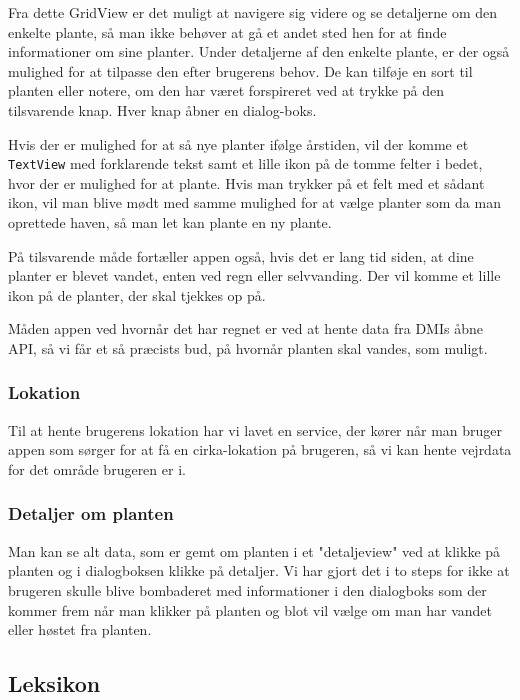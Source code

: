 Fra dette GridView er det muligt at navigere sig videre og se detaljerne om den enkelte plante, så man ikke behøver at gå et andet sted hen for at finde informationer om sine planter. Under detaljerne af den enkelte plante, er der også mulighed for at tilpasse den efter brugerens behov. De kan tilføje en sort til planten eller notere, om den har været forspireret ved at trykke på den tilsvarende knap. Hver knap åbner en dialog-boks.

Hvis der er mulighed for at så nye planter ifølge årstiden, vil der komme et \texttt{TextView} med forklarende tekst samt et lille ikon på de tomme felter i bedet, hvor der er mulighed for at plante. Hvis man trykker på et felt med et sådant ikon, vil man blive mødt med samme mulighed for at vælge planter som da man oprettede haven, så man let kan plante en ny plante.

På tilsvarende måde fortæller appen også, hvis det er lang tid siden, at dine planter er blevet vandet, enten ved regn eller selvvanding. Der vil komme et lille ikon på de planter, der skal tjekkes op på.

Måden appen ved hvornår det har regnet er ved at hente data fra DMIs åbne API, så vi får et så præcists bud, på hvornår planten skal vandes, som muligt.

\subsubsection{Lokation}

Til at hente brugerens lokation har vi lavet en service, der kører når man bruger appen som sørger for at få en cirka-lokation på brugeren, så vi kan hente vejrdata for det område brugeren er i.

\subsubsection{Detaljer om planten}

Man kan se alt data, som er gemt om planten i et "detaljeview" ved at klikke på planten og i dialogboksen klikke på detaljer. Vi har gjort det i to steps for ikke at brugeren skulle blive bombaderet med informationer i den dialogboks som der kommer frem når man klikker på planten og blot vil vælge om man har vandet eller høstet fra planten.

\subsection{Leksikon}

